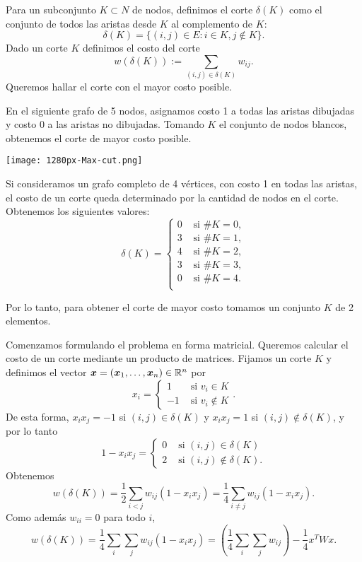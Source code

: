 Para un subconjunto $K \subset N$ de nodos, definimos el corte $\delta(K)$ como el conjunto de todos las aristas desde $K$ al complemento de $K$:
$$
\delta(K) = \{(i,j) \in E : i \in K, j \notin K\}.
$$
Dado un corte $K$ definimos el costo del corte
$$
w(\delta(K)) := \sum_{(i,j) \in \delta(K)} w_{ij}.
$$
Queremos hallar el corte con el mayor costo posible.

\begin{example}
En el siguiente grafo de 5 nodos, asignamos costo 1 a todas las aristas dibujadas y costo 0 a las aristas no dibujadas. Tomando $K$ el conjunto de nodos blancos, obtenemos el corte de mayor costo posible.
\begin{center}
\texttt{[image: 1280px-Max-cut.png]}
\end{center}
\end{example}


\begin{example}
Si consideramos un grafo completo de 4 vértices, con costo 1 en todas las aristas, el costo de un corte queda determinado por la cantidad de nodos en el corte. Obtenemos los siguientes valores:
$$
\delta(K) = \begin{cases}
0 & \text{ si } \#K = 0, \\
3 & \text{ si } \#K = 1, \\
4 & \text{ si } \#K = 2, \\
3 & \text{ si } \#K = 3, \\
0 & \text{ si } \#K = 4. \\
\end{cases}
$$

Por lo tanto, para obtener el corte de mayor costo tomamos un conjunto $K$ de 2 elementos.
\end{example}



Comenzamos formulando el problema en forma matricial. Queremos calcular el costo de un corte mediante un producto de matrices. Fijamos un corte $K$ y definimos el vector $\bm{x} = (\bm{x}_1, \dots, \bm{x}_n) \in \mathbb{R}^n$ por
$$
x_i = \begin{cases}
1 & \text{ si } v_i \in K \\
-1 &  \text{ si } v_i \notin K
\end{cases}.
$$
De esta forma, $x_i x_j = -1$ si $(i,j) \in \delta(K)$ y $x_i x_j = 1$ si $(i,j) \notin \delta(K)$, y por lo tanto
$$
1 - x_i x_j = \begin{cases}
0 & \text{ si } (i,j) \in \delta(K) \\
2 &  \text{ si } (i,j) \notin \delta(K).
\end{cases}
$$
Obtenemos
$$
w(\delta(K)) = \frac{1}{2}\sum_{i < j}w_{ij}(1-x_i x_j) = \frac{1}{4}\sum_{i \neq j}w_{ij}(1-x_i x_j).
$$
Como además $w_{ii} = 0$ para todo $i$,
$$
w(\delta(K)) = \frac{1}{4}\sum_i \sum_j w_{ij}(1-x_i x_j) = \left(\frac{1}{4}\sum_i \sum_j w_{ij} \right) - \frac{1}{4} x^T W x.
$$

